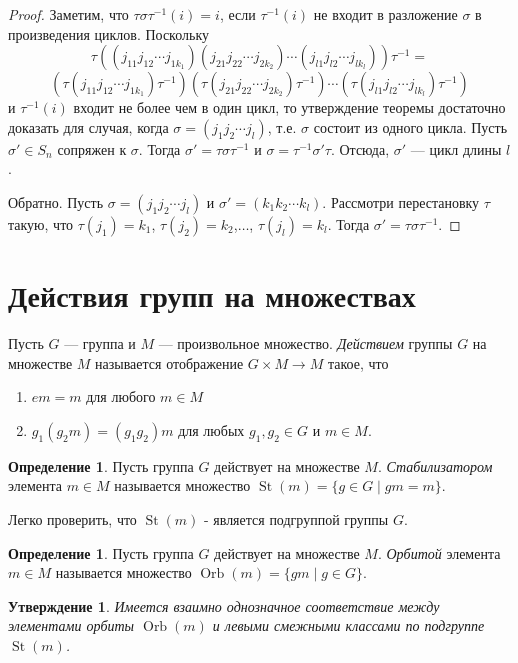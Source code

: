\documentclass[12pt, titlepage, oneside]{amsbook}
\newcommand{\St}{\operatorname{St}}
\newcommand{\Orb}{\operatorname{Orb}}
\newtheorem{claim}[theorem]{Утверждение}
\theoremstyle{definition}
\newtheorem{definition}[theorem]{Определение}
\theoremstyle{remark}
\begin{document}
\begin{proof}
	Заметим, что $\tau\sigma\tau^{-1}(i)=i$, если $\tau^{-1}(i)$ не входит в разложение $\sigma$ в произведения циклов.
	Поскольку $$\tau((j_{11}j_{12}\cdots j_{1k_1})(j_{21}j_{22}\cdots j_{2k_2})\cdots(j_{l1}j_{l2}\cdots j_{lk_l}))\tau^{-1}=$$ $$(\tau(j_{11}j_{12}\cdots j_{1k_1})\tau^{-1})(\tau(j_{21}j_{22}\cdots j_{2k_2})\tau^{-1})\cdots(\tau(j_{l1}j_{l2}\cdots j_{lk_l})\tau^{-1})$$ и $\tau^{-1}(i)$ входит не более чем в один цикл, то утверждение теоремы достаточно доказать для случая, когда $\sigma=(j_1j_2\cdots j_l)$, т.е. $\sigma$ состоит из одного цикла.
	Пусть $\sigma'\in S_n$ сопряжен к $\sigma$. Тогда $\sigma'=\tau\sigma\tau^{-1}$ и $\sigma=\tau^{-1}\sigma'\tau$. Отсюда, $\sigma'$ --- цикл длины $l$.
	
	Обратно. Пусть $\sigma=(j_1j_2\cdots j_l)$ и $\sigma'=(k_1k_2\cdots k_l)$. Рассмотри перестановку $\tau$ такую, что $\tau(j_1)=k_1$, $\tau(j_2)=k_2$,$\ldots$, $\tau(j_l)=k_l$. Тогда $\sigma'=\tau\sigma\tau^{-1}$.
\end{proof}



\section{Действия групп на множествах}

Пусть $G$ --- группа и $M$ --- произвольное множество. \emph{Действием} группы $G$ на множестве $M$ называется отображение $G\times M\rightarrow M$ такое, что
\begin{enumerate}
	\item $e m=m$ для любого $m\in M$
	\item $g_1(g_2 m)=(g_1g_2) m$ для любых $g_1,g_2\in G$ и $m\in M$.
\end{enumerate}

\begin{definition}
	Пусть группа $G$ действует на множестве $M$. \emph{Стабилизатором}
	элемента $m\in M$  называется множество $\St(m)=\{g\in G\mid
		gm=m\}$.
\end{definition}

Легко проверить, что $\St(m)$ - является подгруппой группы $G$.

\begin{definition}
	Пусть группа $G$ действует на множестве $M$. \emph{Орбитой} элемента
	$m\in M$  называется множество $\Orb(m)=\{gm\mid g\in G\}$.
\end{definition}

\begin{claim}
	Имеется взаимно однозначное соответствие между элементами орбиты
	$\Orb(m)$ и левыми смежными классами по подгруппе $\St(m)$.
\end{claim}
\end{document}
